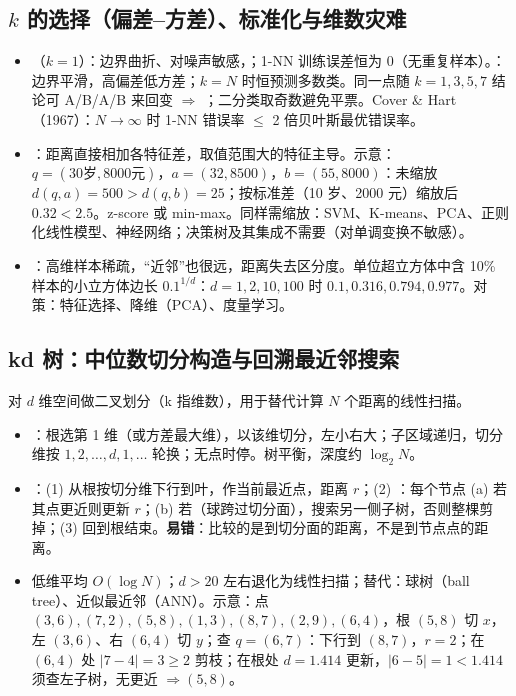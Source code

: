 \subsection{\texorpdfstring{$k$}{k} 的选择（偏差–方差）、标准化与维数灾难}
\begin{itemize}
\item {}（$k=1$）：边界曲折、对噪声敏感，；1-NN 训练误差恒为 0（无重复样本）。：边界平滑，高偏差低方差；$k=N$ 时恒预测多数类。同一点随 $k=1,3,5,7$ 结论可 A/B/A/B 来回变 $\Rightarrow$ ；二分类取奇数避免平票。Cover \& Hart（1967）：$N\to\infty$ 时 1-NN 错误率 $\le$ 2 倍贝叶斯最优错误率。
\item {}：距离直接相加各特征差，取值范围大的特征主导。示意：$q=(30\text{岁},8000\text{元})$，$a=(32,8500)$，$b=(55,8000)$：未缩放 $d(q,a)=500>d(q,b)=25$；按标准差（10 岁、2000 元）缩放后 $0.32<2.5$。z-score 或 min-max。同样需缩放：SVM、K-means、PCA、正则化线性模型、神经网络；决策树及其集成不需要（对单调变换不敏感）。
\item {}：高维样本稀疏，“近邻”也很远，距离失去区分度。单位超立方体中含 10\% 样本的小立方体边长 $0.1^{1/d}$：$d=1,2,10,100$ 时 $0.1,0.316,0.794,0.977$。对策：特征选择、降维（PCA）、度量学习。
\end{itemize}

\subsection{kd 树：中位数切分构造与回溯最近邻搜索}
对 $d$ 维空间做二叉划分（k 指维数），用于替代计算 $N$ 个距离的线性扫描。
\begin{itemize}
\item {}：根选第 1 维（或方差最大维），以该维切分，左小右大；子区域递归，切分维按 $1,2,\dots,d,1,\dots$ 轮换；无点时停。树平衡，深度约 $\log_2N$。
\item {}：(1) 从根按切分维下行到叶，作当前最近点，距离 $r$；(2) ：每个节点 (a) 若其点更近则更新 $r$；(b) 若（球跨过切分面），搜索另一侧子树，否则整棵剪掉；(3) 回到根结束。\textbf{易错}：比较的是到切分面的距离，不是到节点点的距离。
\item 低维平均 $O(\log N)$；$d>20$ 左右退化为线性扫描；替代：球树（ball tree）、近似最近邻（ANN）。示意：点 $(3,6),(7,2),(5,8),(1,3),(8,7),(2,9),(6,4)$，根 $(5,8)$ 切 $x$，左 $(3,6)$、右 $(6,4)$ 切 $y$；查 $q=(6,7)$：下行到 $(8,7)$，$r=2$；在 $(6,4)$ 处 $|7-4|=3\ge2$ 剪枝；在根处 $d=1.414$ 更新，$|6-5|=1<1.414$ 须查左子树，无更近 $\Rightarrow(5,8)$。
\end{itemize}

